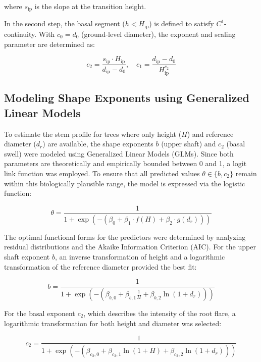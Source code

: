 \documentclass[twocolumn, bibliography=totoc]{scrartcl}
\begin{document}
where $s_{\text{ip}}$ is the slope at the transition height.

In the second step, the basal segment ($h < H_{\text{ip}}$) is defined to satisfy $C^1$-continuity. With $c_0 = d_0$ (ground-level diameter), the exponent and scaling parameter are determined as:

\begin{equation}
c_2 = \frac{s_{\text{ip}} \cdot H_{\text{ip}}}{d_{\text{ip}} - d_0}, \quad
c_1 = \frac{d_{\text{ip}} - d_0}{H_{\text{ip}}^{c_2}}
\end{equation}

\subsection{Modeling Shape Exponents using Generalized Linear Models}

To estimate the stem profile for trees where only height ($H$) and reference diameter ($d_r$) are available, the shape exponents $b$ (upper shaft) and $c_2$ (basal swell) were modeled using Generalized Linear Models (GLMs). Since both parameters are theoretically and empirically bounded between 0 and 1, a logit link function was employed. To ensure that all predicted values $\theta \in \{b, c_2\}$ remain within this biologically plausible range, the model is expressed via the logistic function:

\begin{equation}
\label{eq:glm_general}
\theta = \frac{1}{1 + \exp\left(-\left(\beta_0 + \beta_1 \cdot f(H) + \beta_2 \cdot g(d_r)\right)\right)}
\end{equation}

The optimal functional forms for the predictors were determined by analyzing residual distributions and the Akaike Information Criterion (AIC). For the upper shaft exponent $b$, an inverse transformation of height and a logarithmic transformation of the reference diameter provided the best fit:

\begin{equation}
\label{eq:glm_exponent_b}
b = \frac{1}{1 + \exp\left(-\left(\beta_{b,0} + \beta_{b,1} \frac{1}{H} + \beta_{b,2} \ln(1 + d_r)\right)\right)}
\end{equation}

For the basal exponent $c_2$, which describes the intensity of the root flare, a logarithmic transformation for both height and diameter was selected:

\begin{equation}
\label{eq:glm_exponent_c2}
c_2 = \frac{1}{1 + \exp\left(-\left(\beta_{c_2,0} + \beta_{c_2,1} \ln(1 + H) + \beta_{c_2,2} \ln(1 + d_r)\right)\right)}
\end{equation}
\end{document}
